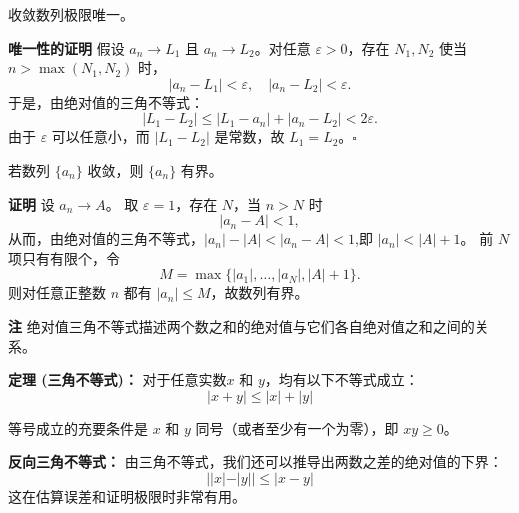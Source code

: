 \documentclass[fontset=fandol]{ctexart}
\newenvironment{custom}[1]{\par\noindent\textbf{#1}\quad}{\par\vspace{0.8em}}
\newenvironment{remark}{\par\noindent\textbf{注}\quad}{\par\vspace{0.8em}}
\begin{document}
\begin{proposition}[极限的唯一性]
	
	
	收敛数列极限唯一。
	
	
	
\end{proposition}
\begin{custom}{唯一性的证明}
	假设 \(a_n \to L_1\) 且 \(a_n \to L_2\)。对任意 \(\varepsilon > 0\)，存在 \(N_1, N_2\) 使当 \(n > \max(N_1, N_2)\) 时，
	\[
	|a_n - L_1| < \varepsilon,\quad |a_n - L_2| < \varepsilon.
	\]
	于是，由绝对值的三角不等式：
	\[
	|L_1 - L_2| \leq |L_1 - a_n| + |a_n - L_2| < 2\varepsilon.
	\]
	由于 \(\varepsilon\) 可以任意小，而 \(|L_1 - L_2|\) 是常数，故 \(L_1 = L_2\)。\(\square\)
\end{custom}


\begin{proposition}[收敛数列有界]
	若数列 $\{a_n\}$ 收敛，则 $\{a_n\}$ 有界。
\end{proposition}
\begin{custom}{证明}
	设 $a_n\to A$。 取 $\varepsilon=1$，存在 $N$，当 $n>N$ 时
	\[
	|a_n-A|<1,
	\]
	从而，由绝对值的三角不等式，$\left| {{a_n}} \right| - \left| A \right| < \left| {{a_n} - A} \right| < 1$,即 $|a_n|<|A|+1$。 前 $N$ 项只有有限个，令
	\[
	M=\max\{|a_1|,\ldots,|a_N|,|A|+1\}.
	\]
	则对任意正整数 $n$ 都有 $|a_n|\le M$，故数列有界。
\end{custom}

\begin{remark}
	绝对值三角不等式描述两个数之和的绝对值与它们各自绝对值之和之间的关系。
	
	\textbf{定理 (三角不等式)：} 对于任意实数$x$ 和 $y$，均有以下不等式成立：
	\begin{equation*}
		|x + y| \le |x| + |y|
	\end{equation*}
	
	等号成立的充要条件是 $x$ 和 $y$ 同号（或者至少有一个为零），即 $xy \ge 0$。
	
	\textbf{反向三角不等式：} 由三角不等式，我们还可以推导出两数之差的绝对值的下界：
	\begin{equation*}
		||x| - |y|| \le |x - y|
	\end{equation*}
	这在估算误差和证明极限时非常有用。
\end{remark}
\end{document}

